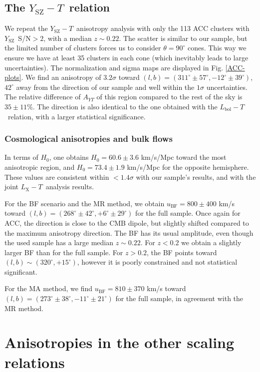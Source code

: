 \documentclass{aa}   %
\newcommand{\LT}{$L_{\text{X}}-T$}
\newcommand{\YT}{$Y_{\text{SZ}}-T$}
\newcommand{\Ysz}{$Y_{\text{SZ}}$}
\newcommand{\ubf}{$u_{\text{BF}}$}
\newcommand{\LbolT}{$L_{\text{bol}}-T$}
\begin{document}
\subsection{The \YT\ relation}\label{acc-YT}

We repeat the \YT\ anisotropy analysis with only the 113 ACC clusters with \Ysz\ S/N$>2$, with a median $z\sim 0.22$. The scatter is similar to our sample, but the limited number of clusters forces us to consider $\theta=90^{\circ}$ cones. This way we ensure we have at least 35 clusters in each cone (which inevitably leads to large uncertainties). The normalization and sigma maps are displayed in Fig. \ref{ACC-plots}. We find an anisotropy of $3.2\sigma$ toward $(l,b)=(311^{\circ}\pm 57^{\circ} ,-12^{\circ}\pm 39^{\circ} )$, $42^{\circ}$ away from the direction of our sample and well within the $1\sigma$ uncertainties. The relative difference of $A_{YT}$ of this region compared to the rest of the sky is $35\pm 11\%$. The direction is also identical to the one obtained with the \LbolT\ relation, with a larger statistical significance.

\subsubsection{Cosmological anisotropies and bulk flows}

In terms of $H_0$, one obtains $H_0=60.6\pm 3.6$ km/s/Mpc toward the most anisotropic region, and $H_0=73.4\pm 1.9$ km/s/Mpc for the opposite hemisphere. These values are consistent within $<1.4\sigma$ with our sample's results, and with the joint \LT\ analysis results. 

For the BF scenario and the MR method, we obtain \ubf$=800\pm 400$ km/s toward $(l,b)=(268^{\circ}\pm 42^{\circ},+6^{\circ}\pm 29^{\circ})$ for the full sample. Once again for ACC, the direction is close to the CMB dipole, but slightly shifted compared to the maximum anisotropy direction. The BF has its usual amplitude, even though the used sample has a large median $z\sim 0.22$. For $z<0.2$ we obtain a slightly larger BF than for the full sample. For $z>0.2$, the BF points toward $(l,b)\sim (320^{\circ},+15^{\circ})$, however it is poorly constrained and not statistical significant.

For the MA method, we find \ubf$=810\pm 370$ km/s toward $(l,b)=(273^{\circ}\pm 38^{\circ},-11^{\circ}\pm 21^{\circ})$ for the full sample, in agreement with the MR method.

\section{Anisotropies in the other scaling relations} \label{other_scal}
\end{document}
